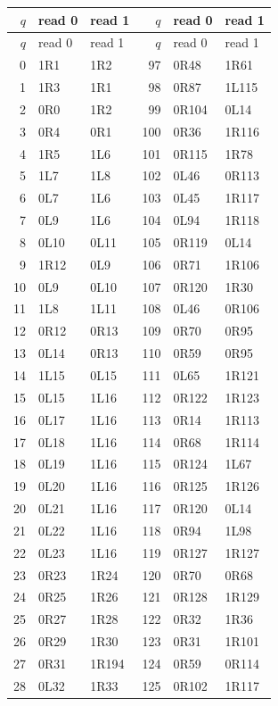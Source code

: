 \begingroup\small
\setlength{\tabcolsep}{7pt}
\begin{longtable}{rll@{\qquad\qquad}rll}
\toprule $q$ & read 0 & read 1 & $q$ & read 0 & read 1\\
\midrule\endfirsthead
\toprule $q$ & read 0 & read 1 & $q$ & read 0 & read 1\\
\midrule\endhead
0 & 1R1 & 1R2 & 97 & 0R48 & 1R61\\
1 & 1R3 & 1R1 & 98 & 0R87 & 1L115\\
2 & 0R0 & 1R2 & 99 & 0R104 & 0L14\\
3 & 0R4 & 0R1 & 100 & 0R36 & 1R116\\
4 & 1R5 & 1L6 & 101 & 0R115 & 1R78\\
5 & 1L7 & 1L8 & 102 & 0L46 & 0R113\\
6 & 0L7 & 1L6 & 103 & 0L45 & 1R117\\
7 & 0L9 & 1L6 & 104 & 0L94 & 1R118\\
8 & 0L10 & 0L11 & 105 & 0R119 & 0L14\\
9 & 1R12 & 0L9 & 106 & 0R71 & 1R106\\
10 & 0L9 & 0L10 & 107 & 0R120 & 1R30\\
11 & 1L8 & 1L11 & 108 & 0L46 & 0R106\\
12 & 0R12 & 0R13 & 109 & 0R70 & 0R95\\
13 & 0L14 & 0R13 & 110 & 0R59 & 0R95\\
14 & 1L15 & 0L15 & 111 & 0L65 & 1R121\\
15 & 0L15 & 1L16 & 112 & 0R122 & 1R123\\
16 & 0L17 & 1L16 & 113 & 0R14 & 1R113\\
17 & 0L18 & 1L16 & 114 & 0R68 & 1R114\\
18 & 0L19 & 1L16 & 115 & 0R124 & 1L67\\
19 & 0L20 & 1L16 & 116 & 0R125 & 1R126\\
20 & 0L21 & 1L16 & 117 & 0R120 & 0L14\\
21 & 0L22 & 1L16 & 118 & 0R94 & 1L98\\
22 & 0L23 & 1L16 & 119 & 0R127 & 1R127\\
23 & 0R23 & 1R24 & 120 & 0R70 & 0R68\\
24 & 0R25 & 1R26 & 121 & 0R128 & 1R129\\
25 & 0R27 & 1R28 & 122 & 0R32 & 1R36\\
26 & 0R29 & 1R30 & 123 & 0R31 & 1R101\\
27 & 0R31 & 1R194 & 124 & 0R59 & 0R114\\
28 & 0L32 & 1R33 & 125 & 0R102 & 1R117\\

\end{longtable}
